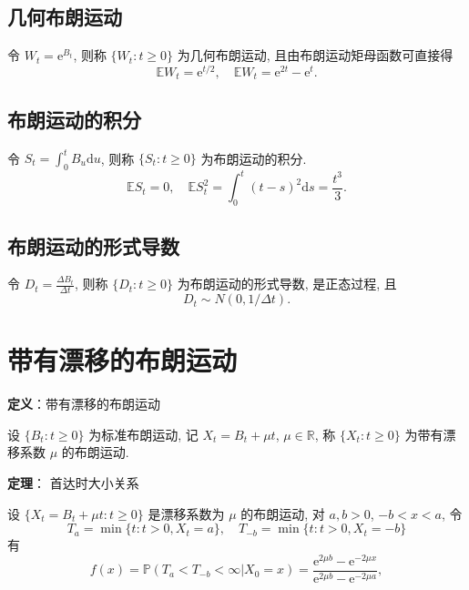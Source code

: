 \documentclass[openany]{ctexbook}
\theoremstyle{kaiti}
\theoremstyle{normal}
\begin{document}
\subsection{几何布朗运动}
令 $W_t=\mathrm{e}^{B_t}$, 则称 $\{W_t:t\geqslant0\}$ 为几何布朗运动, 且由布朗运动矩母函数可直接得
\begin{equation}
  \mathbb{E}W_t=\mathrm{e}^{t/2},\quad \mathbb{E}W_t=\mathrm{e}^{2t}-\mathrm{e}^{t}.
\end{equation}

\subsection{布朗运动的积分}
令 $\displaystyle S_t=\int_0^tB_u\mathrm{d}u$, 则称 $\{S_t:t\geqslant0\}$ 为布朗运动的积分.
\begin{equation}
  \mathbb{E}S_t=0,\quad \mathbb{E}S_t^2=\int_0^t (t-s)^2\mathrm{d}s=\frac{t^3}{3}.
\end{equation}

\subsection{布朗运动的形式导数}
令 $D_t=\frac{\Delta B_t}{\Delta t}$, 则称 $\{D_t:t\geqslant0\}$ 为布朗运动的形式导数, 是正态过程, 且
\begin{equation}
  D_t\sim N(0,1/\Delta t).
\end{equation}

\section{带有漂移的布朗运动}

\textbf{定义}：带有漂移的布朗运动

设 $\{B_t:t\geqslant0\}$ 为标准布朗运动, 记 $X_t=B_t+\mu t$, $\mu\in\mathbb{R}$, 称 $\{X_t:t\geqslant0\}$ 为带有漂移系数 $\mu$ 的布朗运动.

\textbf{定理}： 首达时大小关系

设 $\{X_t=B_t+\mu t:t\geqslant0\}$ 是漂移系数为 $\mu$ 的布朗运动, 对 $a,b>0$, $-b<x<a$, 令
\begin{equation}
  T_a=\min\{t:t>0,X_t=a\},\quad T_{-b}=\min\{t:t>0,X_t=-b\}
\end{equation}
有
\begin{equation}
  f(x)=\mathbb{P}(T_a<T_{-b}<\infty|X_0=x)=\frac{\mathrm{e}^{2\mu b}-\mathrm{e}^{-2\mu x}}{\mathrm{e}^{2\mu b}-\mathrm{e}^{-2\mu a}},
\end{equation}
\end{document}
